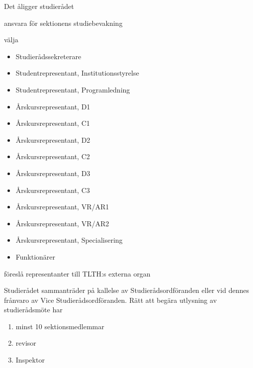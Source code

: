 \documentclass[pdfbookmarks,a4paper,11pt]{article}
\newlength{\itemcollength}
\newenvironment{reglemlista}{%
  \begin{list}{}{%
      \setlength{\labelwidth}{\itemcollength}%
      \setlength{\leftmargin}{\labelwidth + \labelsep}%
      \renewcommand{\makelabel}[1]{%
        \raisebox{0pt}[1ex][0pt]{%
          \makebox[\labelwidth][l]{%
            \parbox[t]{\itemcollength}{%
              \raggedright\hspace{0pt}##1}}}\hfill}%
      }}{%
  \end{list}}
\begin{document}
\begin{reglemlista}

	\item[Åligganden]
	Det åligger studierådet
	\begin{attlista}
		\item ansvara för sektionens studiebevakning
		\item välja
		\begin{itemize}
			\item Studierådssekreterare
			\item Studentrepresentant, Institutionsstyrelse
			\item Studentrepresentant, Programledning
			\item Årskursrepresentant, D1
			\item Årskursrepresentant, C1
			\item Årskursrepresentant, D2
			\item Årskursrepresentant, C2
			\item Årskursrepresentant, D3
			\item Årskursrepresentant, C3
			\item Årskursrepresentant, VR/AR1
			\item Årskursrepresentant, VR/AR2
            \item Årskursrepresentant, Specialisering
			\item Funktionärer
		\end{itemize}
		
		\item föreslå representanter till TLTH:s externa organ
	\end{attlista}

	\item[Sammanträde]
	Studierådet sammanträder på kallelse av Studierådsordföranden eller vid
	dennes frånvaro av Vice Studierådsordföranden. Rätt att begära utlysning av
	studierådsmöte har
	\begin{enumerate}
		\item minst 10 sektionsmedlemmar
		\item revisor
		\item Inspektor
	\end{enumerate}
	

\end{reglemlista}
\end{document}
